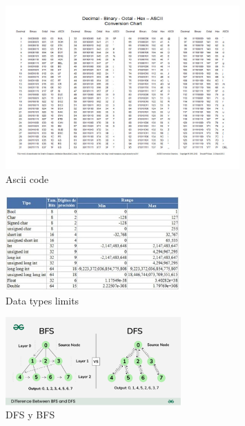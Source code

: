 \begin{figure}[H]
    \centering
    \includegraphics[width=0.8\textwidth]{code/pictures/Ascii.jpg}
    \caption{Ascii code}
    \label{Ascii}
\end{figure}
\begin{figure}[H]
    \centering
    \includegraphics[width=0.6\textwidth]{code/pictures/DataTypes.jpg}
    \caption{Data types limits}
    \label{DataTypes}
\end{figure}
\begin{figure}[H]
    \centering
    \includegraphics[width=0.6\textwidth]{code/pictures/dfs_bfs.png}
    \caption{DFS y BFS}
    \label{DFS_BFS}
\end{figure}

